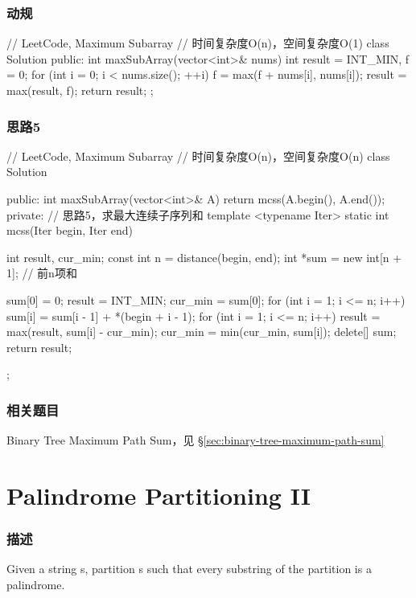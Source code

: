 \subsubsection{动规}
\begin{Code}
// LeetCode, Maximum Subarray
// 时间复杂度O(n)，空间复杂度O(1)
class Solution {
public:
    int maxSubArray(vector<int>& nums) {
        int result = INT_MIN, f = 0;
        for (int i = 0; i < nums.size(); ++i) {
            f = max(f + nums[i], nums[i]);
            result = max(result, f);
        }
        return result;
    }
};
\end{Code}


\subsubsection{思路5}
\begin{Code}
// LeetCode, Maximum Subarray
// 时间复杂度O(n)，空间复杂度O(n)
class Solution {
public:
    int maxSubArray(vector<int>& A) {
        return mcss(A.begin(), A.end());
    }
private:
    // 思路5，求最大连续子序列和
    template <typename Iter>
    static int mcss(Iter begin, Iter end) {
        int result, cur_min;
        const int n = distance(begin, end);
        int *sum = new int[n + 1];  // 前n项和

        sum[0] = 0;
        result = INT_MIN;
        cur_min = sum[0];
        for (int i = 1; i <= n; i++) {
            sum[i] = sum[i - 1] + *(begin  + i - 1);
        }
        for (int i = 1; i <= n; i++) {
            result = max(result, sum[i] - cur_min);
            cur_min = min(cur_min, sum[i]);
        }
        delete[] sum;
        return result;
    }
};
\end{Code}


\subsubsection{相关题目}
\begindot
\item Binary Tree Maximum Path Sum，见 \S \ref{sec:binary-tree-maximum-path-sum}
\myenddot


\section{Palindrome Partitioning II} %
\label{sec:palindrome-partitioning-ii}


\subsubsection{描述}
Given a string s, partition s such that every substring of the partition is a palindrome.

